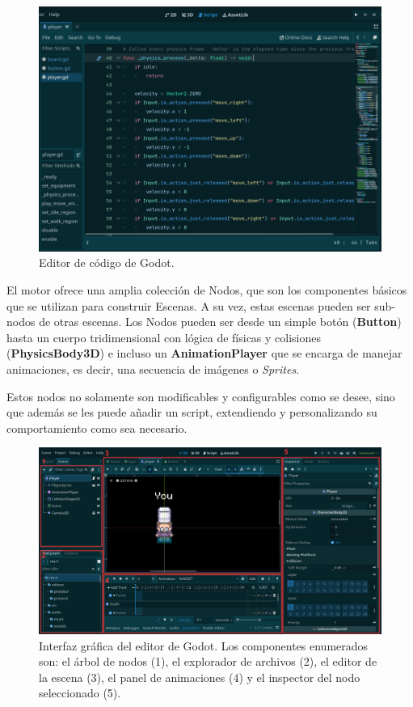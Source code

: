 \begin{figure}[htbp]
    \centering
    \includegraphics[width=1.0\textwidth]{../assets/godot-code-editor.png}
    \caption{Editor de código de Godot.}
\end{figure}

El motor ofrece una amplia colección de Nodos, que son los componentes básicos que se utilizan para 
construir Escenas. A su vez, estas escenas pueden ser sub-nodos de otras escenas. Los Nodos pueden ser desde un 
simple botón (\textbf{Button}) hasta un cuerpo tridimensional con lógica de físicas y colisiones 
(\textbf{PhysicsBody3D}) e incluso un \textbf{AnimationPlayer} que se encarga de manejar animaciones, 
es decir, una secuencia de imágenes o \textit{Sprites}.

Estos nodos no solamente son modificables y configurables como se desee, sino que además se les puede 
añadir un script, extendiendo y personalizando su comportamiento como sea necesario.

\begin{figure}[htbp]
    \centering
    \includegraphics[width=1.0\textwidth]{../assets/godot-editor.png}
    \caption{Interfaz gráfica del editor de Godot. Los componentes enumerados son: el árbol de nodos (1),
            el explorador de archivos (2), el editor de la escena (3), el panel de animaciones (4) y el
            inspector del nodo seleccionado (5).}
\end{figure}

